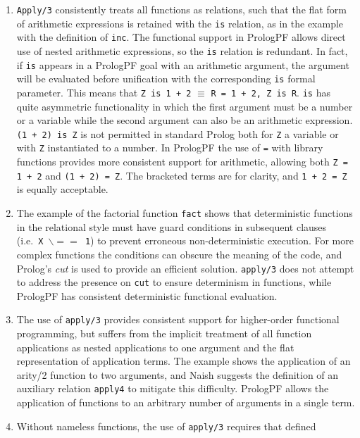 \begin{enumerate}
\item{\texttt{Apply/3} consistently treats all functions as relations, such
  that the flat form of arithmetic expressions is retained with the \texttt{is}
  relation, as in the example with the definition of \texttt{inc}.  The functional
  support in PrologPF allows direct use of nested arithmetic expressions, so the
  \texttt{is} relation is redundant.  In fact, if \texttt{is} appears in a
  PrologPF goal with an arithmetic argument, the argument will be evaluated before
  unification with the corresponding \texttt{is} formal parameter.  This means that
  \texttt{Z is 1 + 2} $\equiv$ \texttt{R = 1 + 2, Z is R}.  \texttt{is}
  has quite asymmetric functionality
  in which the first argument must be a number or a variable while
  the second argument can also be an arithmetic expression.
  \texttt{(1 + 2) is Z} is not permitted in standard Prolog both for
  \texttt{Z} a variable or with \texttt{Z} instantiated to a number.  In PrologPF the
  use of \texttt{=} with library functions provides more consistent support for
  arithmetic,  allowing both \texttt{Z = 1 + 2} and \texttt{(1 + 2) = Z}.  The
  bracketed terms are for clarity, and \texttt{1 + 2 = Z} is equally acceptable.}
\item{The example of the factorial function \texttt{fact} shows that deterministic
  functions in the relational style must have guard conditions in subsequent clauses
  (i.e.\ \texttt{X $\backslash = =$\ 1}) to prevent erroneous non-deterministic execution.
  For more complex functions the conditions can obscure the meaning of the code, and
  Prolog's \textit{cut} is used to provide an efficient solution.  \texttt{apply/3}
  does not attempt to address the presence on \texttt{cut} to ensure determinism
  in functions, while PrologPF has consistent deterministic functional evaluation.}
\item{The use of \texttt{apply/3} provides consistent support for higher-order
  functional programming, but suffers from the implicit treatment of all function
  applications as nested applications to one argument and the flat representation of
  application terms.  The example shows the application of an arity/2 function to
  two arguments, and Naish \cite{Nai96} suggests the definition of an auxiliary
  relation \texttt{apply4} to mitigate this difficulty.  PrologPF allows the
  application of functions to an arbitrary number of arguments in a single term.}
\item{Without nameless functions, the use of \texttt{apply/3} requires that defined
}
\end{enumerate}
